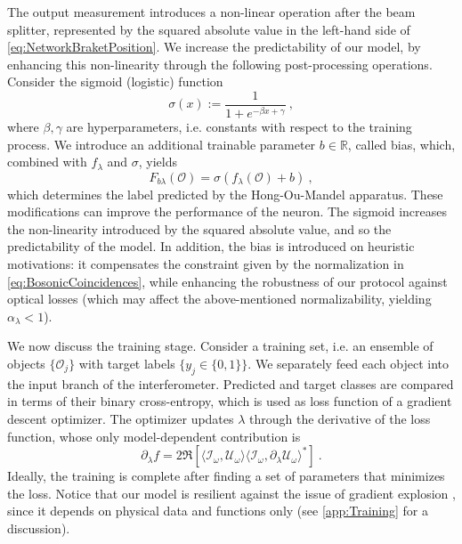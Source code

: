\documentclass[reprint,
superscriptaddress,
nofootinbib,
aps,
pra,
showkeys
]{revtex4-2}
\newcommand{\I}{\mathcal{I}}
\newcommand{\U}{\mathcal{U}}
\newcommand{\f}{f}
\newcommand{\F}{F}
\renewcommand{\O}{\mathcal{O}}
\begin{document}
The output measurement introduces a non-linear operation after the beam splitter, represented by the squared absolute value in the left-hand side of \cref{eq:NetworkBraketPosition}. We increase the predictability of our model, by enhancing this non-linearity through the following post-processing operations. Consider the sigmoid (logistic) function
\begin{equation}
	\sigma(x) := \frac{1}{1+e^{-\beta x + \gamma}} \ ,
	\label{eq:SigmoidFunction}
\end{equation}
where $\beta, \gamma$ are hyperparameters, i.e. constants with respect to the training process. We introduce an additional trainable parameter $b \in \mathbb{R}$, called bias, which, combined with $f_{\lambda}$ and $\sigma$, yields
\begin{equation}
	\F_{b\lambda}(\O) = \sigma(\f_{\lambda}(\O) + b) \ ,
	\label{eq:FinalOutputPosition}
\end{equation}
which determines the label predicted by the Hong-Ou-Mandel apparatus. These modifications can improve the performance of the neuron. The sigmoid increases the non-linearity introduced by the squared absolute value, and so the predictability of the model. In addition, the bias is introduced on heuristic motivations: it compensates the constraint given by the normalization in \cref{eq:BosonicCoincidences}, while enhancing the robustness of our protocol against optical losses (which may affect the above-mentioned normalizability, yielding $\alpha_{\lambda} < 1 $).

We now discuss the training stage. Consider a training set, i.e. an ensemble of objects $\{\O_j\}$ with target labels $\{y_j \in \{0,1\}\}$. We separately feed each object into the input branch of the interferometer. Predicted and target classes are compared in terms of their binary cross-entropy, which is used as loss function of a gradient descent optimizer. The optimizer updates $\lambda$ through the derivative of the loss function, whose only model-dependent contribution is
\begin{equation}
	\partial_\lambda \f = 2 \Re \left[ \langle \I_{\omega}, \U_{\omega} \rangle \langle \I_{\omega}, \partial_{\lambda}\U_{\omega} \rangle^* \right] \ .
	\label{eq:DerivativeComplete}
\end{equation}	
Ideally, the training is complete after finding a set of parameters  that minimizes the loss. Notice that our model is resilient against the issue of gradient explosion \citep{art:Glorot}, since it depends on physical data and functions only (see \cref{app:Training} for a discussion).
\end{document}
